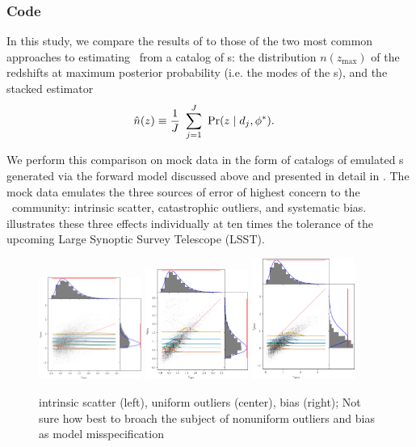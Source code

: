 \subsubsection{Code}

In this study, we compare the results of  to those of the two most common approaches to estimating \nz\ from a catalog of \pzpdf s: the distribution $n(z_{\mathrm{max}})$ of the redshifts at maximum posterior probability (i.e. the modes of the \pzpdf s), and the stacked estimator
\begin{align}
\eqlabel{eqn:stacked}
\hat{n}(z) &\equiv \frac{1}{J}\ \sum_{j=1}^{J}\ \Pr(z \mid d_{j}, \phi^{*}) .
\end{align}

We perform this comparison on mock data in the form of catalogs of emulated \pzpdf s generated via the forward model discussed above and presented in detail in .
The mock data emulates the three sources of error of highest concern to the \pz\ community: intrinsic scatter, catastrophic outliers, and systematic bias.
 illustrates these three effects individually at ten times the tolerance of the upcoming Large Synoptic Survey Telescope (LSST).
\begin{figure}
	\begin{center}
		\includegraphics[width=0.3\textwidth]{figures/chippr/hivarsigmas_scatter.png}
		\includegraphics[width=0.3\textwidth]{figures/chippr/uouthi_scatter.png}
		\includegraphics[width=0.3\textwidth]{figures/chippr/neghivarbias_scatter.png}
		\caption{intrinsic scatter (left), uniform outliers (center), bias (right);
			Not sure how best to broach the subject of nonuniform outliers and bias as model misspecification
		}
	\end{center}
\end{figure}
